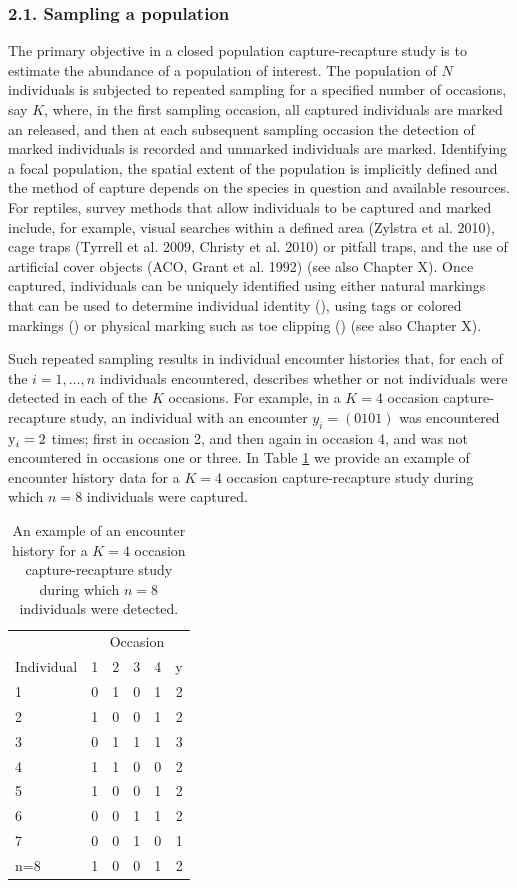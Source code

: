 \documentclass{book}
\begin{document}
\subsubsection*{2.1. Sampling a population}

The primary objective in a closed population capture-recapture study
is to estimate the abundance of a population of interest. The
population of $N$ individuals is subjected to repeated sampling for a
specified number of occasions, say $K$, where, in the first sampling
occasion, all captured individuals are marked an released, and then at
each subsequent sampling occasion the detection of marked individuals
is recorded and unmarked individuals are marked. Identifying a focal
population, the spatial extent of the population is implicitly defined
and the method of capture depends on the species in question and
available resources. For reptiles, survey methods that allow
individuals to be captured and marked include, for example, visual
searches within a defined area (Zylstra et al. 2010), cage traps
(Tyrrell et al. 2009, Christy et al. 2010) or pitfall traps, and the
use of artificial cover objects (ACO, Grant et al. 1992) (see also Chapter X).
Once captured, individuals can be uniquely identified using either natural
markings that can be used to determine individual identity (), using
tags or colored markings () or physical marking such as toe clipping
() (see also Chapter X).

Such repeated sampling results in individual encounter histories that,
for each of the $i=1,\ldots,n$ individuals encountered, describes
whether or not individuals were detected in each of the $K$
occasions. For example, in a $K = 4$ occasion capture-recapture study,
an individual with an encounter $y_i = (0 1 0 1)$ was encountered
$\hbox{y}_i = 2$ times; first in occasion 2, and then again in
occasion 4, and was not encountered in occasions one or three. In
Table \ref{enchist} we provide an example of encounter history data
for a $K=4$ occasion capture-recapture study during which $n=8$
individuals were captured.

\begin{table}[h]
  \centering
  \caption{An example of an encounter history for a $K = 4$ occasion capture-recapture study during which $n=8$ individuals were detected.}
  \label{enchist}
 \begin{tabular}{lccccr}
 \hline
    &\multicolumn{5}{c}{Occasion} \\
  Individual & 1 & 2 & 3 & 4 & y\\
 \hline
  1   & 0 & 1 & 0 & 1 & 2 \\
  2   & 1 & 0 & 0 & 1 & 2 \\
  3   & 0 & 1 & 1 & 1 & 3 \\
  4   & 1 & 1 & 0 & 0 & 2 \\
  5   & 1 & 0 & 0 & 1 & 2 \\
  6   & 0 & 0 & 1 & 1 & 2 \\
  7   & 0 & 0 & 1 & 0 & 1 \\
  n=8 & 1 & 0 & 0 & 1 & 2 \\
 \hline
 \end{tabular}
\end{table}
\end{document}
